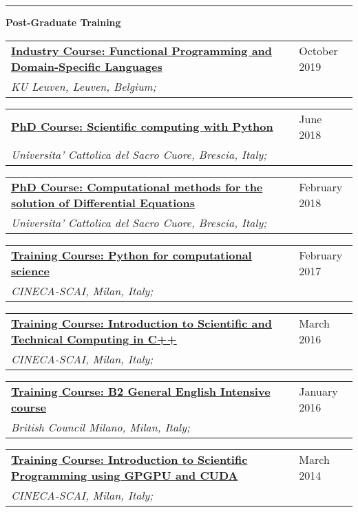 \documentclass[a4paper]{article}
\newcommand{\block}[1]{\hrule \vspace{0.2cm} \textbf{\Large #1} \vspace{0.2cm}}
\newcommand{\longvoice}[8]{
    \begin{tabular}{p{0.83\linewidth} p{0.17\linewidth} }
        \textbf{\href{#3}{#2: #1}} & #4 
        \\ 
        \textit{#5, #6, #7;} & {\small\emph{#8}}
    \end{tabular}
    \vspace{.5em}
    }
\begin{document}
    \block{Post-Graduate Training}
   
    \longvoice{Functional Programming and Domain-Specific Languages}
        {Industry Course}
        {https://dtai.cs.kuleuven.be/events/fpcourse/}
        {October 2019}
        {KU Leuven}
        {Leuven}
        {Belgium}
        {}
    \longvoice{Scientific computing with Python}
        {PhD Course}
        {https://web.archive.org/web/20180604081514/http://dmf.unicatt.it/~della/pythoncourse18/}
        {June 2018}
        {Universita' Cattolica del Sacro Cuore}
        {Brescia}
        {Italy}
        {}
    \longvoice{Computational methods for the solution of Differential Equations}
        {PhD Course}
        {https://www.dropbox.com/s/q2rapau2k49n5t7/1802-Course-NumericalPdeAvella.pdf?dl=0}
        {February 2018}
        {Universita' Cattolica del Sacro Cuore}
        {Brescia}
        {Italy}
        {}
    \longvoice{Python for computational science}
        {Training Course}
        {https://web.archive.org/web/20170623170252/https://eventi.cineca.it/en/hpc/python-computational-science}
        {February 2017}
        {CINECA-SCAI}
        {Milan}
        {Italy}
        {}
    \longvoice{Introduction to Scientific and Technical Computing in C++}
        {Training Course}
        {https://web.archive.org/save/http://www.hpc.cineca.it/content/introduction-object-oriented}
        {March 2016}
        {CINECA-SCAI}
        {Milan}
        {Italy}
        {}
    \longvoice{B2 General English Intensive course}
        {Training Course}
        {https://www.britishcouncil.it/en/english/courses-adults/general}
        {January 2016}
        {British Council Milano}
        {Milan}
        {Italy}
        {}
    \longvoice{Introduction to Scientific Programming using GPGPU and CUDA}
        {Training Course}
        {https://web.archive.org/web/20170623171128/http://www.hpc.cineca.it/content/introduction-to-gpu}
        {March 2014}
        {CINECA-SCAI}
        {Milan}
        {Italy}
        {}
    
\end{document}
